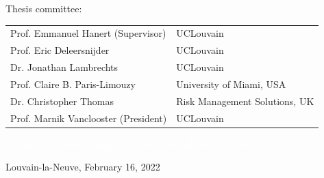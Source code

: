 \vspace*{0.5cm}
\begin{minipage}{\textwidth}
\begin{center}

\large Thesis committee:\\

\vspace*{0.5cm}
\footnotesize{
\hspace{-1cm}
\begin{tabular}{ll}
Prof. Emmanuel Hanert (Supervisor)   & UCLouvain \\
Prof. Eric Deleersnijder             & UCLouvain\\
Dr. Jonathan Lambrechts              & UCLouvain \\
Prof. Claire B. Paris-Limouzy        & University of Miami, USA \\
Dr. Christopher Thomas               & Risk Management Solutions, UK \\
Prof. Marnik Vanclooster (President) & UCLouvain
\end{tabular}
}

\textcolor{white}{Et pour la tradition, Régis Malpas \& Marc-Henry Comans}

\end{center}
\end{minipage}

\vspace*{.5cm}
\begin{minipage}{\textwidth}
\centering
\large Louvain-la-Neuve, February 16, 2022
\end{minipage}
